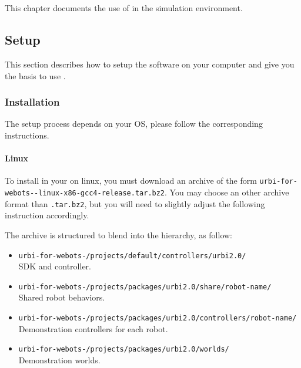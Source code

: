 \newenvironment{attribute}[4]
{
  \item \lstinline|#1|
    \begin{description}
    \item[Permissions] #2.
    \item[Type] #3.
      \ifx#4\empty\else
    \item[Range] #4.
      \fi
    \item[Description]
}{
    \end{description}
}

\chapter{\webots}
\label{sec:webots}

This chapter documents the use of \urbi in the \webots simulation
environment.

\section{Setup}

This section describes how to setup the software on your computer and
give you the basis to use \uwebots{}.

\subsection{Installation}

The setup process depends on your OS, please follow the corresponding
instructions.

\subsubsection{Linux}

To install \uwebots{} in your \webots{} on linux, you must download an
archive of the form
\texttt{urbi-for-webots--linux-x86-gcc4-release.tar.bz2}.
You may choose an other archive format than \texttt{.tar.bz2}, but you
will need to slightly adjust the following instruction accordingly.

The archive is structured to blend into the \webots hierarchy, as
follow:

\begin{itemize}
\item \texttt{urbi-for-webots-/projects/default/controllers/urbi2.0/}\\ \urbi{} SDK and
  \webots{} controller.
\item \texttt{urbi-for-webots-/projects/packages/urbi2.0/share/robot-name/}\\ Shared
  \us{} robot behaviors.
\item \texttt{urbi-for-webots-/projects/packages/urbi2.0/controllers/robot-name/}\\
  Demonstration controllers for each robot.
\item \texttt{urbi-for-webots-/projects/packages/urbi2.0/worlds/}\\ Demonstration
  worlds.
\end{itemize}

